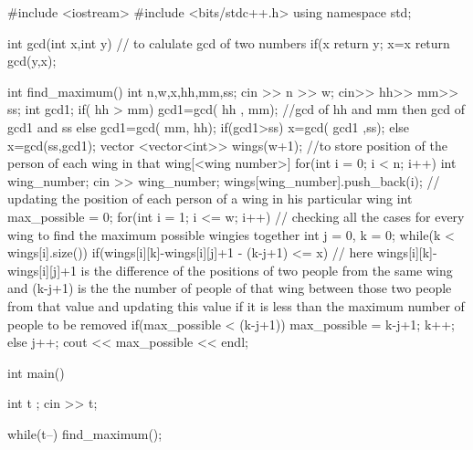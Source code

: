 #include <iostream>
#include <bits/stdc++.h>
using namespace std;
 
int gcd(int x,int y) // to calulate gcd of two numbers
{
    if(x%
    return y;
    x=x%
    return gcd(y,x);
}

int find_maximum()
{
    int n,w,x,hh,mm,ss;
    cin >> n >> w;
    cin>> hh>> mm>> ss;
    int gcd1; 
    if( hh > mm)
    gcd1=gcd( hh , mm); //gcd of hh and mm then gcd of gcd1 and ss
    else
    gcd1=gcd( mm, hh); 
    if(gcd1>ss)
    x=gcd( gcd1 ,ss);
    else
    x=gcd(ss,gcd1);
    vector <vector<int>> wings(w+1); //to store position of the person of each wing in that wing[<wing number>]
    for(int i = 0; i < n; i++){
        int wing_number;
        cin >> wing_number;
        wings[wing_number].push_back(i); // updating the position of each person of a wing in his particular wing
    }
    int max_possible = 0;
    for(int i = 1; i <= w; i++){ // checking all the cases for every wing to find the maximum possible wingies together
        int j = 0, k = 0;
        while(k < wings[i].size()){
            if(wings[i][k]-wings[i][j]+1 - (k-j+1) <= x){ // here wings[i][k]-wings[i][j]+1 is the difference of the positions of two people from the same wing and (k-j+1) is the the number of people of that wing between those two people from that value and updating this value if it is less than the maximum number of people to be removed
               if(max_possible < (k-j+1))
                max_possible = k-j+1;
                k++;
            }
            else{
                j++;
            }   
        }
    }    
    cout << max_possible << endl;
}

int main(){
    int t ;
    cin >> t;

    while(t--){
        find_maximum();
    }
}
